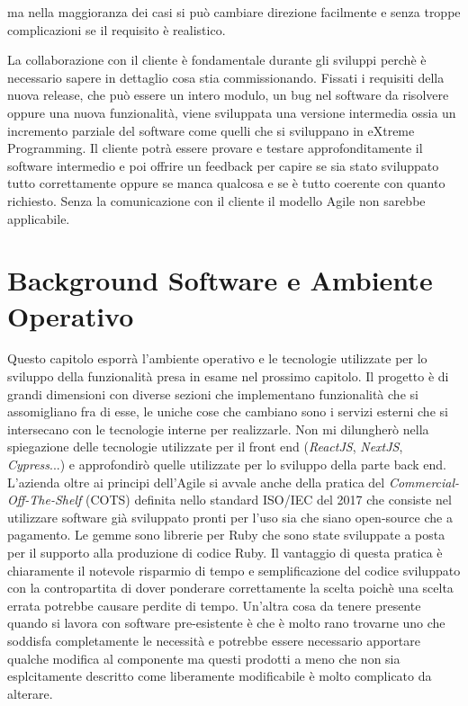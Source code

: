 \documentclass[target=bach,aauheader=,style=]{thud}
\begin{document}
ma nella maggioranza dei casi si può cambiare direzione facilmente e senza troppe complicazioni se il requisito è realistico.
\par La collaborazione con il cliente è fondamentale durante gli sviluppi perchè è necessario sapere in dettaglio cosa stia commissionando.
Fissati i requisiti della nuova release, che può essere un intero modulo, un bug nel software da risolvere oppure una nuova funzionalità, viene sviluppata
una versione intermedia ossia un incremento parziale del software come quelli che si sviluppano in eXtreme Programming. Il cliente potrà essere provare e
testare approfonditamente il software intermedio e poi offrire un feedback per capire se sia stato sviluppato tutto correttamente oppure se manca qualcosa
e se è tutto coerente con quanto richiesto. Senza la comunicazione con il cliente il modello Agile non sarebbe applicabile.

\chapter{Background Software e Ambiente Operativo}

Questo capitolo esporrà l'ambiente operativo e le tecnologie utilizzate per lo sviluppo della funzionalità presa in esame nel prossimo capitolo.
Il progetto è di grandi dimensioni con diverse sezioni che implementano funzionalità che si assomigliano fra di esse, le uniche cose che cambiano
sono i servizi esterni che si intersecano con le tecnologie interne per realizzarle.
Non mi dilungherò nella spiegazione delle tecnologie utilizzate per il front end (\textit{ReactJS}\cite{react_dev_home}, \textit{NextJS}\cite{nextjs_home},
\textit{Cypress}\cite{cypress}...) e approfondirò quelle utilizzate per lo sviluppo della parte back end. 
L'azienda oltre ai principi dell'Agile si avvale anche della pratica del \textit{Commercial-Off-The-Shelf} (COTS) definita nello standard ISO/IEC del 2017\cite{iso_iec_12207_2017}
che consiste nel utilizzare software già sviluppato pronti per l'uso sia che siano open-source che a pagamento. Le gemme sono librerie per Ruby che sono state sviluppate a posta
per il supporto alla produzione di codice Ruby. Il vantaggio di questa pratica è chiaramente il notevole risparmio di tempo e semplificazione del codice sviluppato con la
contropartita di dover ponderare correttamente la scelta poichè una scelta errata potrebbe causare perdite di tempo. Un'altra cosa da tenere presente quando si
lavora con software pre-esistente è che è molto rano trovarne uno che soddisfa completamente le necessità e potrebbe essere necessario apportare qualche modifica al
componente ma questi prodotti a meno che non sia esplcitamente descritto come liberamente modificabile è molto complicato da alterare.
\end{document}
